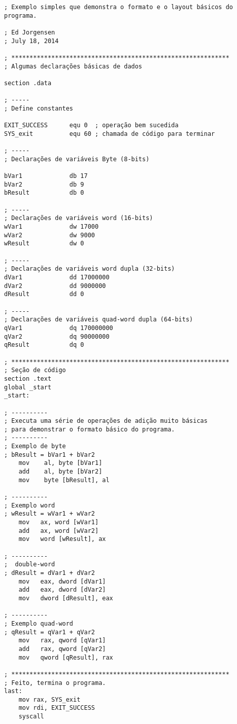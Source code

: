 \begin{verbatim}
; Exemplo simples que demonstra o formato e o layout básicos do programa.

; Ed Jorgensen
; July 18, 2014

; ************************************************************
; Algumas declarações básicas de dados

section .data

; -----
; Define constantes

EXIT_SUCCESS      equ 0  ; operação bem sucedida
SYS_exit          equ 60 ; chamada de código para terminar

; -----
; Declarações de variáveis Byte (8-bits)

bVar1             db 17 
bVar2             db 9
bResult           db 0

; -----
; Declarações de variáveis word (16-bits)
wVar1             dw 17000
wVar2             dw 9000
wResult           dw 0

; -----
; Declarações de variáveis word dupla (32-bits)
dVar1             dd 17000000
dVar2             dd 9000000
dResult           dd 0

; -----
; Declarações de variáveis quad-word dupla (64-bits)
qVar1             dq 170000000
qVar2             dq 90000000
qResult           dq 0

; ************************************************************
; Seção de código
section .text
global _start
_start:

; ----------
; Executa uma série de operações de adição muito básicas
; para demonstrar o formato básico do programa.
; ----------
; Exemplo de byte
; bResult = bVar1 + bVar2
    mov    al, byte [bVar1]
    add    al, byte [bVar2]
    mov    byte [bResult], al

; ----------
; Exemplo word
; wResult = wVar1 + wVar2
    mov   ax, word [wVar1]
    add   ax, word [wVar2]
    mov   word [wResult], ax

; ----------
;  double-word
; dResult = dVar1 + dVar2
    mov   eax, dword [dVar1]
    add   eax, dword [dVar2]
    mov   dword [dResult], eax

; ----------
; Exemplo quad-word
; qResult = qVar1 + qVar2
    mov   rax, qword [qVar1]
    add   rax, qword [qVar2]
    mov   qword [qResult], rax

; ************************************************************
; Feito, termina o programa.
last:
    mov rax, SYS_exit
    mov rdi, EXIT_SUCCESS
    syscall
\end{verbatim}

